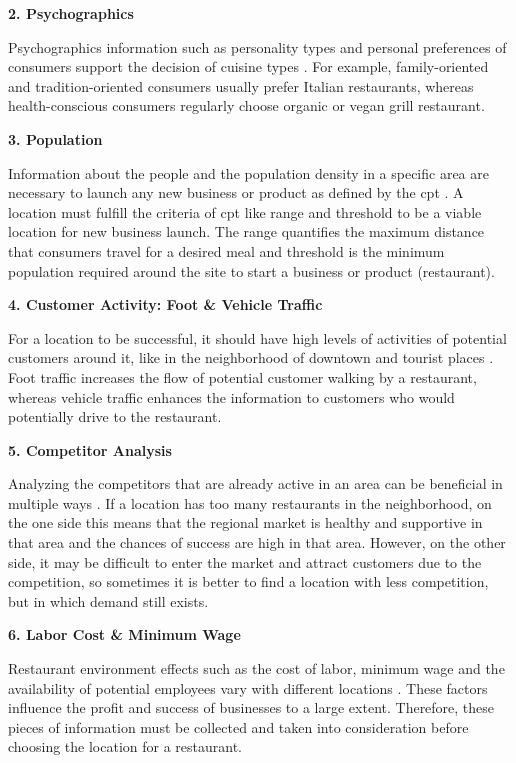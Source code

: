 \documentclass[a4paper, 11pt, oneside]{Thesis}  %
\begin{document}
\textbf{2.	Psychographics}

Psychographics information such as personality types and personal preferences of consumers support the decision of cuisine types \cite{EvanTarver.21.04.2017}. For example, family-oriented and tradition-oriented consumers usually prefer Italian restaurants, whereas health-conscious consumers regularly choose organic or vegan grill restaurant. 

\textbf{3.	Population}

Information about the people and the population density in a specific area are necessary to launch any new business or product as defined by the \ac{cpt} \cite{Chen.2016}. A location must fulfill the criteria of \ac{cpt} like range and threshold to be a viable location for new business launch. The range quantifies the maximum distance that consumers travel for a desired meal and threshold is the minimum population required around the site to start a business or product (restaurant).

\textbf{4.	Customer Activity: Foot \& Vehicle Traffic}

For a location to be successful, it should have high levels of activities of potential customers around it, like in the neighborhood of downtown and tourist places \cite{EvanTarver.21.04.2017}. Foot traffic increases the flow of potential customer walking by a restaurant, whereas vehicle traffic enhances the information to customers who would potentially drive to the restaurant.


\textbf{5.	Competitor Analysis}

Analyzing the competitors that are already active in an area can be beneficial in multiple ways \cite{EvanTarver.21.04.2017}. If a location has too many restaurants in the neighborhood, on the one side this means that the regional market is healthy and supportive in that area and the chances of success are high in that area. However, on the other side, it may be difficult to enter the market and attract customers due to the competition, so sometimes it is better to find a location with less competition, but in which demand still exists. 

\textbf{6.	Labor Cost \& Minimum Wage}

Restaurant environment effects such as the cost of labor, minimum wage and the availability of potential employees vary with different locations \cite{Webstaurantstore.com.25.07.2018}. These factors influence the profit and success of businesses to a large extent. Therefore, these pieces of information must be collected and taken into consideration before choosing the location for a restaurant.
\end{document}
